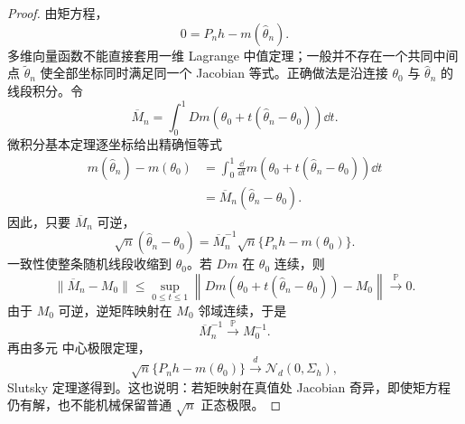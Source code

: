 \begin{proof}
由矩方程，
\[
 0=P_nh-m(\widehat\theta_n).
\]
多维向量函数不能直接套用一维 Lagrange 中值定理；一般并不存在一个共同中间点 $\widetilde\theta_n$ 使全部坐标同时满足同一个 Jacobian 等式。正确做法是沿连接 $\theta_0$ 与 $\widehat\theta_n$ 的线段积分。令
\[
 \overline M_n
 =\int_0^1
 Dm\!\left(
 \theta_0+t(\widehat\theta_n-\theta_0)
 \right)\dd t.
\]
微积分基本定理逐坐标给出精确恒等式
\begin{align*}
 m(\widehat\theta_n)-m(\theta_0)
 &=\int_0^1
 \frac{\dd}{\dd t}
 m\!\left(
 \theta_0+t(\widehat\theta_n-\theta_0)
 \right)\dd t\\
 &=\overline M_n(\widehat\theta_n-\theta_0).
\end{align*}
因此，只要 $\overline M_n$ 可逆，
\[
 \sqrt n(\widehat\theta_n-\theta_0)
 =\overline M_n^{-1}
 \sqrt n\{P_nh-m(\theta_0)\}.
\]
一致性使整条随机线段收缩到 $\theta_0$。若 $Dm$ 在 $\theta_0$ 连续，则
\[
 \|\overline M_n-M_0\|
 \le
 \sup_{0\le t\le1}
 \left\|
 Dm\!\left(
 \theta_0+t(\widehat\theta_n-\theta_0)
 \right)-M_0
 \right\|
 \xrightarrow{\mathbb P}0.
\]
由于 $M_0$ 可逆，逆矩阵映射在 $M_0$ 邻域连续，于是
\[
 \overline M_n^{-1}\xrightarrow{\mathbb P} M_0^{-1}.
\]
再由多元 中心极限定理，
\[
 \sqrt n\{P_nh-m(\theta_0)\}
 \xrightarrow{d}\mathcal N_d(0,\Sigma_h),
\]
Slutsky 定理遂得到。这也说明：若矩映射在真值处 Jacobian 奇异，即使矩方程仍有解，也不能机械保留普通 $\sqrt n$ 正态极限。
\end{proof}


